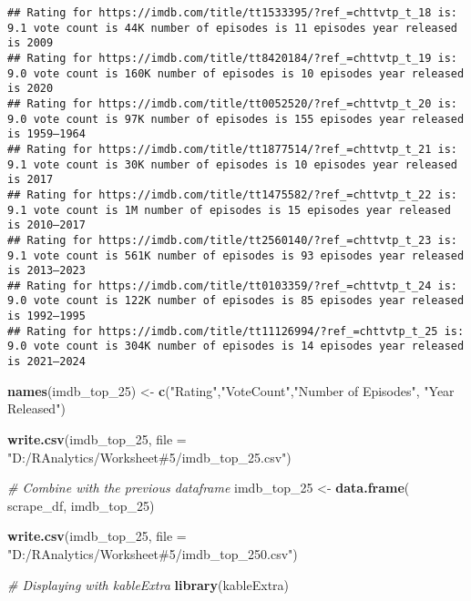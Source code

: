 \documentclass[
]{article}
\newenvironment{Shaded}{\begin{snugshade}}{\end{snugshade}}
\newcommand{\AttributeTok}[1]{\textcolor[rgb]{0.13,0.29,0.53}{#1}}
\newcommand{\CommentTok}[1]{\textcolor[rgb]{0.56,0.35,0.01}{\textit{#1}}}
\newcommand{\FunctionTok}[1]{\textcolor[rgb]{0.13,0.29,0.53}{\textbf{#1}}}
\newcommand{\NormalTok}[1]{#1}
\newcommand{\OtherTok}[1]{\textcolor[rgb]{0.56,0.35,0.01}{#1}}
\newcommand{\StringTok}[1]{\textcolor[rgb]{0.31,0.60,0.02}{#1}}
\begin{document}
\begin{verbatim}
## Rating for https://imdb.com/title/tt1533395/?ref_=chttvtp_t_18 is: 9.1 vote count is 44K number of episodes is 11 episodes year released is 2009 
## Rating for https://imdb.com/title/tt8420184/?ref_=chttvtp_t_19 is: 9.0 vote count is 160K number of episodes is 10 episodes year released is 2020 
## Rating for https://imdb.com/title/tt0052520/?ref_=chttvtp_t_20 is: 9.0 vote count is 97K number of episodes is 155 episodes year released is 1959–1964 
## Rating for https://imdb.com/title/tt1877514/?ref_=chttvtp_t_21 is: 9.1 vote count is 30K number of episodes is 10 episodes year released is 2017 
## Rating for https://imdb.com/title/tt1475582/?ref_=chttvtp_t_22 is: 9.1 vote count is 1M number of episodes is 15 episodes year released is 2010–2017 
## Rating for https://imdb.com/title/tt2560140/?ref_=chttvtp_t_23 is: 9.1 vote count is 561K number of episodes is 93 episodes year released is 2013–2023 
## Rating for https://imdb.com/title/tt0103359/?ref_=chttvtp_t_24 is: 9.0 vote count is 122K number of episodes is 85 episodes year released is 1992–1995 
## Rating for https://imdb.com/title/tt11126994/?ref_=chttvtp_t_25 is: 9.0 vote count is 304K number of episodes is 14 episodes year released is 2021–2024
\end{verbatim}

\begin{Shaded}
\begin{Highlighting}[]
\FunctionTok{names}\NormalTok{(imdb\_top\_25) }\OtherTok{\textless{}{-}} \FunctionTok{c}\NormalTok{(}\StringTok{"Rating"}\NormalTok{,}\StringTok{"VoteCount"}\NormalTok{,}\StringTok{"Number of Episodes"}\NormalTok{, }\StringTok{"Year Released"}\NormalTok{)}

\FunctionTok{write.csv}\NormalTok{(imdb\_top\_25, }\AttributeTok{file =} \StringTok{"D:/RAnalytics/Worksheet\#5/imdb\_top\_25.csv"}\NormalTok{)}

\CommentTok{\# Combine with the previous dataframe}
\NormalTok{imdb\_top\_25 }\OtherTok{\textless{}{-}} \FunctionTok{data.frame}\NormalTok{(}
\NormalTok{  scrape\_df, imdb\_top\_25)}

\FunctionTok{write.csv}\NormalTok{(imdb\_top\_25, }\AttributeTok{file =} \StringTok{"D:/RAnalytics/Worksheet\#5/imdb\_top\_250.csv"}\NormalTok{)}
\end{Highlighting}
\end{Shaded}

\begin{Shaded}
\begin{Highlighting}[]
\CommentTok{\# Displaying with kableExtra}
\FunctionTok{library}\NormalTok{(kableExtra)}
\end{Highlighting}
\end{Shaded}
\end{document}
